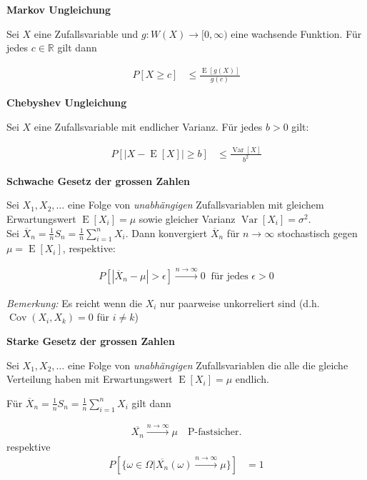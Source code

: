 \documentclass[25pt]{sciposter}
\newcommand{\R}{\mathbb{R}}
\newcommand{\Var}{\operatorname{Var}}
\newcommand{\E}{\operatorname{E}}
\newenvironment{method}[1]{\begin{mdframed}[backgroundcolor=blue!10,innertopmargin=15pt, innerbottommargin=15pt,nobreak=true]
		\textbf{#1 }
	}
	{ 
	\end{mdframed}
}
\begin{document}
\begin{multicols}{3}
\begin{method}{Markov Ungleichung}
	Sei $X$ eine Zufallsvariable und $g:W(X)\to [0,\infty)$ eine wachsende Funktion. Für jedes $c\in\R$ gilt dann 
	
	\begin{align*}
		P[X \geq c] &\leq \frac{\E[g(X)]}{g(c)}
	\end{align*}
\end{method}


\begin{method}{Chebyshev Ungleichung}
	Sei $X$ eine Zufallsvariable mit endlicher Varianz. Für jedes $b>0$ gilt:
	
	\begin{align*}
		P[|X-\E[X]| \geq b] &\leq \frac{\Var[X]}{b^2}
	\end{align*}
\end{method}


\begin{method}{Schwache Gesetz der grossen Zahlen}
	Sei $X_1,X_2,\ldots$ eine Folge von \textit{unabhängigen} Zufallsvariablen mit gleichem Erwartungswert $\E[X_i] = \mu$ sowie gleicher Varianz $\Var[X_i] = \sigma^2$.\\
	
	
	Sei $\overline{X}_n = \frac{1}{n}S_n = \frac{1}{n} \sum_{i=1}^{n} X_i$. Dann konvergiert $\overline{X}_n$ für $n\to\infty $ stochastisch gegen $\mu = \E[X_i]$, respektive:
	
	\begin{align*}
		P[|\overline{X}_n - \mu|> \epsilon] \stackrel{n\to\infty}{\longrightarrow}   0 \ \text{ für jedes }\epsilon > 0
	\end{align*}
	
	\textit{Bemerkung:} Es reicht wenn die $X_i$ nur paarweise unkorreliert sind (d.h. $\operatorname{Cov}(X_i,X_k) = 0$ für $i \neq k$)
	
\end{method}


\begin{method}{Starke Gesetz der grossen Zahlen}
	Sei $X_1,X_2,\ldots$ eine Folge von \textit{unabhängigen} Zufallsvariablen die alle die gleiche Verteilung haben mit Erwartungswert $\E[X_i] = \mu$ endlich. 
	
	Für $\overline{X}_n = \frac{1}{n}S_n = \frac{1}{n} \sum_{i=1}^{n} X_i$ gilt dann 
	
	\begin{align*}
		\overline{X_n} \stackrel{n \to \infty}{\longrightarrow} \mu \quad \text{P-fastsicher}.
	\end{align*}  
	respektive
	\begin{align*}
	P\left[ \{ \omega \in \Omega | \overline{X_n}(\omega)  \stackrel{n \to \infty}{\longrightarrow}  \mu  \} \right] &= 1
	\end{align*}
\end{method}


\end{multicols}
\end{document}
